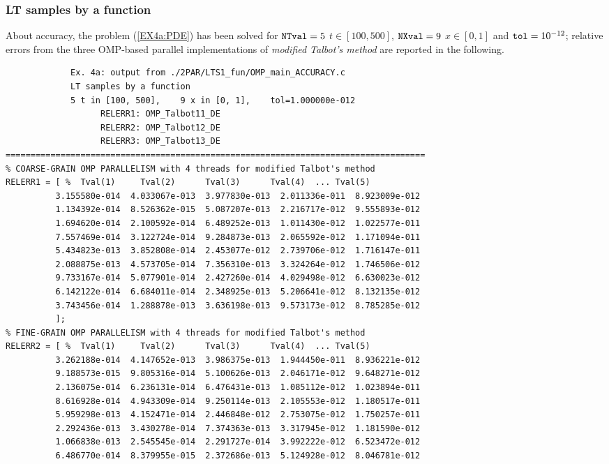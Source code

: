 \documentclass[a4paper,10pt]{report}%
\begin{document}
\subsubsection{LT samples by a function}
About accuracy, the problem (\ref{EX4a:PDE}) has been solved for ${\tt NTval}=5$ $t\in[100, 500]$,
${\tt NXval}=9$ $x\in[0,1]$ and ${\tt tol}=10^{-12}$; relative errors from the three OMP-based parallel
implementations of {\em modified Talbot's method} are reported in the following.
\begin{lstlisting}
             Ex. 4a: output from ./2PAR/LTS1_fun/OMP_main_ACCURACY.c
             LT samples by a function
             5 t in [100, 500],    9 x in [0, 1],    tol=1.000000e-012
                   RELERR1: OMP_Talbot11_DE
                   RELERR2: OMP_Talbot12_DE
                   RELERR3: OMP_Talbot13_DE
====================================================================================
% COARSE-GRAIN OMP PARALLELISM with 4 threads for modified Talbot's method
RELERR1 = [ %  Tval(1)     Tval(2)      Tval(3)      Tval(4)  ... Tval(5)
          3.155580e-014  4.033067e-013  3.977830e-013  2.011336e-011  8.923009e-012
          1.134392e-014  8.526362e-015  5.087207e-013  2.216717e-012  9.555893e-012
          1.694620e-014  2.100592e-014  6.489252e-013  1.011430e-012  1.022577e-011
          7.557469e-014  3.122724e-014  9.284873e-013  2.065592e-012  1.171094e-011
          5.434823e-013  3.852808e-014  2.453077e-012  2.739706e-012  1.716147e-011
          2.088875e-013  4.573705e-014  7.356310e-013  3.324264e-012  1.746506e-012
          9.733167e-014  5.077901e-014  2.427260e-014  4.029498e-012  6.630023e-012
          6.142122e-014  6.684011e-014  2.348925e-013  5.206641e-012  8.132135e-012
          3.743456e-014  1.288878e-013  3.636198e-013  9.573173e-012  8.785285e-012
          ];
% FINE-GRAIN OMP PARALLELISM with 4 threads for modified Talbot's method
RELERR2 = [ %  Tval(1)     Tval(2)      Tval(3)      Tval(4)  ... Tval(5)
          3.262188e-014  4.147652e-013  3.986375e-013  1.944450e-011  8.936221e-012
          9.188573e-015  9.805316e-014  5.100626e-013  2.046171e-012  9.648271e-012
          2.136075e-014  6.236131e-014  6.476431e-013  1.085112e-012  1.023894e-011
          8.616928e-014  4.943309e-014  9.250114e-013  2.105553e-012  1.180517e-011
          5.959298e-013  4.152471e-014  2.446848e-012  2.753075e-012  1.750257e-011
          2.292436e-013  3.430278e-014  7.374363e-013  3.317945e-012  1.181590e-012
          1.066838e-013  2.545545e-014  2.291727e-014  3.992222e-012  6.523472e-012
          6.486770e-014  8.379955e-015  2.372686e-013  5.124928e-012  8.046781e-012

\end{lstlisting}
\end{document}
